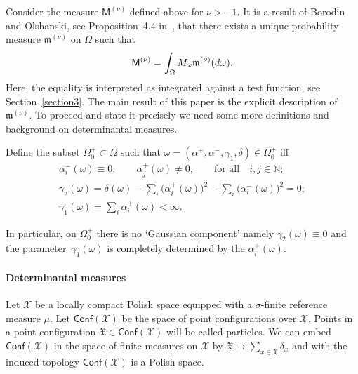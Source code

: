 \documentclass[11pt]{article}
\numberwithin{equation}{section}
\begin{document}
Consider the measure $\mathsf{M}^{(\nu)}$ defined above for $\nu >-1$. It is a result of Borodin and Olshanski, see Proposition~4.4 in~\cite{BorodinOlshanskiErgodic}, that there exists a unique probability measure $\mathfrak{m}^{(\nu)}$ on $\Omega$ such that
\begin{gather*}
\mathsf{M}^{(\nu)}=\int_{\Omega}^{}M_{\omega}\mathfrak{m}^{(\nu)}({\rm d}\omega).
\end{gather*}
Here, the equality is interpreted as integrated against a test function, see Section~\ref{section3}.
The main result of this paper is the explicit description of~$\mathfrak{m}^{(\nu)}$. To proceed and state it precisely we need some more definitions and background on determinantal measures.

\begin{Definition} Define the subset $\Omega_0^+ \subset \Omega$ such that $\omega=\left(\alpha^+,\alpha^-, \gamma_1, \delta\right) \in \Omega_0^+$ iff
\begin{gather*}
\alpha_i^{-}(\omega) \equiv 0, \qquad \alpha_j^{+}(\omega) \neq 0, \qquad \text{for all} \quad i,j \in \mathbb{N};\\
\gamma_2(\omega) =\delta(\omega)-\sum_{i}^{}\big(\alpha_i^+(\omega)\big)^2-\sum_{i}^{}\big(\alpha_i^-(\omega)\big)^2=0;\\
\gamma_1(\omega) = \sum_{i }^{}\alpha_i^{+}(\omega)<\infty.
\end{gather*}
\end{Definition}
In particular, on $\Omega_0^+$ there is no `Gaussian component' namely $\gamma_2(\omega)\equiv 0$ and the para\-me\-ter~$\gamma_1(\omega)$ is completely determined by the $\alpha_i^+(\omega)$.

\paragraph{Determinantal measures}
Let $\mathcal{X}$ be a locally compact Polish space equipped with a $\sigma$-finite reference measure $\mu$. Let $\mathsf{Conf}(\mathcal{X})$ be the space of point configurations over $\mathcal{X}$. Points in a point configuration $\mathfrak{X} \in \mathsf{Conf}(\mathcal{X})$ will be called particles. We can embed $\mathsf{Conf}(\mathcal{X})$ in the space of finite measures on $\mathcal{X}$ by $\mathfrak{X}\mapsto \sum\limits_{x \in \mathfrak{X}}^{}\delta_x$ and with the induced topology $\mathsf{Conf}(\mathcal{X})$ is a Polish space.
\end{document}
